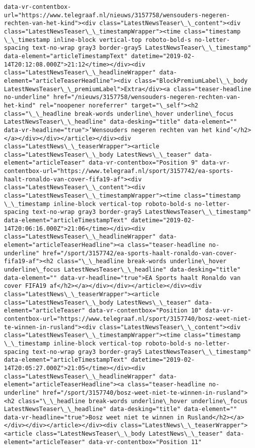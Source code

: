 \documentclass[11pt]{article}
\begin{document}
\begin{Verbatim}[commandchars=\\\{\}]
data-vr-contentbox-url="https://www.telegraaf.nl/nieuws/3157758/wensouders-negeren-rechten-van-het-kind"><div class="LatestNewsTeaser\_\_content"><div class="LatestNewsTeaser\_\_timestampWrapper"><time class="timestamp \_\_timestamp inline-block vertical-top roboto-bold-s no-letter-spacing text-no-wrap gray3 border-gray5 LatestNewsTeaser\_\_timestamp" data-element="articleTimestampText" datetime="2019-02-14T20:12:08.000Z">21:12</time></div><div class="LatestNewsTeaser\_\_headlineWrapper" data-element="articleTeaserHeadline"><div class="BlockPremiumLabel\_\_body LatestNewsTeaser\_\_premiumLabel">Extra</div><a class="teaser-headline no-underline" href="/nieuws/3157758/wensouders-negeren-rechten-van-het-kind" rel="noopener noreferrer" target="\_self"><h2 class="\_\_headline break-words underline\_hover underline\_focus LatestNewsTeaser\_\_headline" data-desking="title" data-element="" data-vr-headline="true">’Wensouders negeren rechten van het kind’</h2></a></div></div></article></div><div class="LatestNews\_\_teaserWrapper"><article class="LatestNewsTeaser\_\_body LatestNews\_\_teaser" data-element="articleTeaser" data-vr-contentbox="Position 9" data-vr-contentbox-url="https://www.telegraaf.nl/sport/3157742/ea-sports-haalt-ronaldo-van-cover-fifa19-af"><div class="LatestNewsTeaser\_\_content"><div class="LatestNewsTeaser\_\_timestampWrapper"><time class="timestamp \_\_timestamp inline-block vertical-top roboto-bold-s no-letter-spacing text-no-wrap gray3 border-gray5 LatestNewsTeaser\_\_timestamp" data-element="articleTimestampText" datetime="2019-02-14T20:06:16.000Z">21:06</time></div><div class="LatestNewsTeaser\_\_headlineWrapper" data-element="articleTeaserHeadline"><a class="teaser-headline no-underline" href="/sport/3157742/ea-sports-haalt-ronaldo-van-cover-fifa19-af"><h2 class="\_\_headline break-words underline\_hover underline\_focus LatestNewsTeaser\_\_headline" data-desking="title" data-element="" data-vr-headline="true">EA Sports haalt Ronaldo van cover FIFA19 af</h2></a></div></div></article></div><div class="LatestNews\_\_teaserWrapper"><article class="LatestNewsTeaser\_\_body LatestNews\_\_teaser" data-element="articleTeaser" data-vr-contentbox="Position 10" data-vr-contentbox-url="https://www.telegraaf.nl/sport/3157740/bosz-weet-niet-te-winnen-in-rusland"><div class="LatestNewsTeaser\_\_content"><div class="LatestNewsTeaser\_\_timestampWrapper"><time class="timestamp \_\_timestamp inline-block vertical-top roboto-bold-s no-letter-spacing text-no-wrap gray3 border-gray5 LatestNewsTeaser\_\_timestamp" data-element="articleTimestampText" datetime="2019-02-14T20:05:27.000Z">21:05</time></div><div class="LatestNewsTeaser\_\_headlineWrapper" data-element="articleTeaserHeadline"><a class="teaser-headline no-underline" href="/sport/3157740/bosz-weet-niet-te-winnen-in-rusland"><h2 class="\_\_headline break-words underline\_hover underline\_focus LatestNewsTeaser\_\_headline" data-desking="title" data-element="" data-vr-headline="true">Bosz weet niet te winnen in Rusland</h2></a></div></div></article></div><div class="LatestNews\_\_teaserWrapper"><article class="LatestNewsTeaser\_\_body LatestNews\_\_teaser" data-element="articleTeaser" data-vr-contentbox="Position 11" 
\end{Verbatim}
\end{document}
